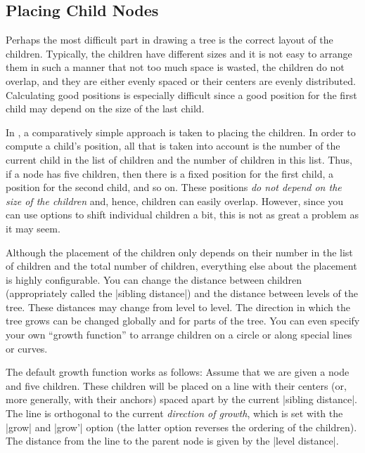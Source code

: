 \subsection{Placing Child Nodes}

\label{section-tree-placement}

Perhaps the most difficult part in drawing a tree is the correct
layout of the children. Typically, the children have different sizes
and it is not easy to arrange them in such a manner that not too much
space is wasted, the children do not overlap, and they are either 
evenly spaced or their centers are evenly distributed. Calculating
good positions is especially difficult since a good position for the
first child may depend on the size of the last child.

In \tikzname, a comparatively simple approach is taken to placing the
children. In order to compute a child's position, all that is taken
into account is the number of the current child in the list of
children and the number of children in this list. Thus, if a node has
five children, then there is a fixed position for the first child, a
position for the second child, and so on. These positions \emph{do not
  depend on the size of the children} and, hence, children can easily
overlap. However, since you can use options to shift individual
children a bit, this is not as great a problem as it may seem.

Although the placement of the children only depends on their number in
the list of children and the total number of children, everything else
about the placement is highly configurable. You can change the
distance between children (appropriately called the
|sibling distance|) and the distance between levels of the tree. These
distances may change from level to level. The direction in which the
tree grows can be changed globally and for parts of the tree. You can
even specify your own ``growth function'' to arrange children on a
circle or along special lines or curves. 

The default growth function works as follows: Assume that we are given
a node and five children. These children will be placed on a line with
their centers (or, more generally, with their anchors) spaced apart by
the current |sibling distance|. The line is 
orthogonal to the current \emph{direction of growth}, which is set
with the |grow| and |grow'| option (the latter option reverses the
ordering of the children). The distance from the line to the parent node
is given by the |level distance|.

